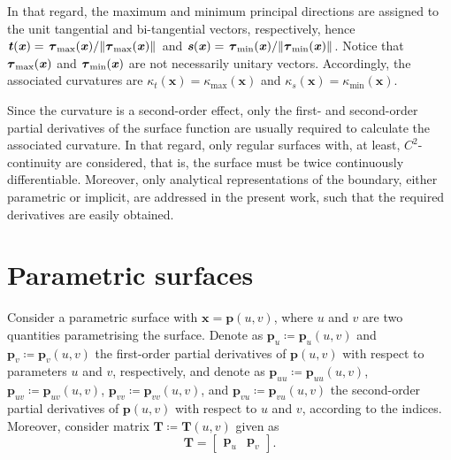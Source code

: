 In that regard, the maximum and minimum principal directions are assigned to the unit tangential and bi-tangential vectors, respectively, hence $\bm{t}\left(\bm{x}\right)=\left.\bs{\tau}_{\textrm{max}}\left(\bm{x}\right)\middle/\left\Vert\bs{\tau}_{\textrm{max}}\left(\bm{x}\right)\right\Vert\right.$ and $\bm{s}\left(\bm{x}\right)=\left.\bs{\tau}_{\textrm{min}}\left(\bm{x}\right)\middle/\left\Vert\bs{\tau}_{\textrm{min}}\left(\bm{x}\right)\right\Vert\right.$.
Notice that $\bs{\tau}_{\textrm{max}}\left(\bm{x}\right)$ and $\bs{\tau}_{\textrm{min}}\left(\bm{x}\right)$ are not necessarily unitary vectors.
Accordingly, the associated curvatures are $\kappa_{t}\left(\bm{x}\right)=\kappa_{\textrm{max}}\left(\bm{x}\right)$ and $\kappa_{s}\left(\bm{x}\right)=\kappa_{\textrm{min}}\left(\bm{x}\right)$.

Since the curvature is a second-order effect, only the first- and second-order partial derivatives of the surface function are usually required to calculate the associated curvature. 
In that regard, only regular surfaces with, at least, $C^{2}$-continuity are considered, that is, the surface must be twice continuously differentiable.
Moreover, only analytical representations of the boundary, either parametric or implicit, are addressed in the present work, such that the required derivatives are easily obtained.

\section{Parametric surfaces}
\label{subsubsec:appendix_parametric_surfaces}

Consider a parametric surface with $\bm{x}=\bm{p}\left(u,v\right)$, where $u$ and $v$ are two quantities parametrising the surface.
Denote as $\bm{p}_{u}\coloneqq\bm{p}_{u}\left(u,v\right)$ and $\bm{p}_{v}\coloneqq\bm{p}_{v}\left(u,v\right)$ the first-order partial derivatives of $\bm{p}\left(u,v\right)$ with respect to parameters $u$ and $v$, respectively, and denote as $\bm{p}_{uu}\coloneqq\bm{p}_{uu}\left(u,v\right)$, $\bm{p}_{uv}\coloneqq\bm{p}_{uv}\left(u,v\right)$, $\bm{p}_{vv}\coloneqq\bm{p}_{vv}\left(u,v\right)$, and $\bm{p}_{vu}\coloneqq\bm{p}_{vu}\left(u,v\right)$ the second-order partial derivatives of $\bm{p}\left(u,v\right)$ with respect to $u$ and $v$, according to the indices.
Moreover, consider matrix $\bm{T}\coloneqq\bm{T}\left(u,v\right)$ given as
\begin{equation}
\bm{T}=\begin{bmatrix}
\bm{p}_{u} & \bm{p}_{v}
\end{bmatrix}.
\end{equation}

